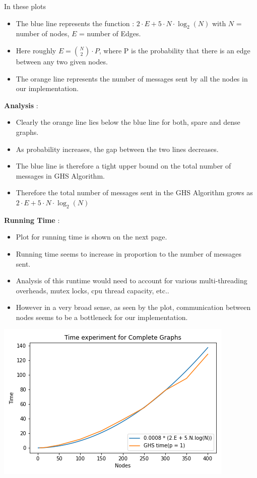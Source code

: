 \documentclass[letterpaper,11pt]{article}
\begin{document}
	
	In these plots 
	\begin{itemize}
		\item The blue line represents the function : $2 \cdot E + 5 \cdot N \cdot \log_2(N)$ with $N$ = number of nodes, $E$ = number of Edges.
		\item Here roughly $E = {N \choose 2} \cdot P$, where P is the probability that there is an edge between any two given nodes.
		\item The orange line represents the number of messages sent by all the nodes in our implementation.
	\end{itemize} 

	{\bf Analysis } :
	\begin{itemize}
		\item Clearly the orange line lies below the blue line for both, spare and dense graphs.
		\item As probability increases, the gap between the two lines decreases. 
		\item The blue line is therefore a tight upper bound on the total number of messages in GHS Algorithm. 
		\item Therefore the total number of messages sent in the GHS Algorithm grows as $2 \cdot E + 5 \cdot N \cdot \log_2(N)$
	\end{itemize}

	{\bf Running Time} :
	\begin{itemize}
		\item Plot for running time is shown on the next page.
		\item Running time seems to increase in proportion to the number of messages sent.
		\item Analysis of this runtime would need to account for various multi-threading overheads, mutex locks, cpu thread capacity, etc.. 
		\item However in a very broad sense, as seen by the plot, communication between nodes seems to be a bottleneck for our implementation.
	\end{itemize}


	\includegraphics{time}
\end{document}
